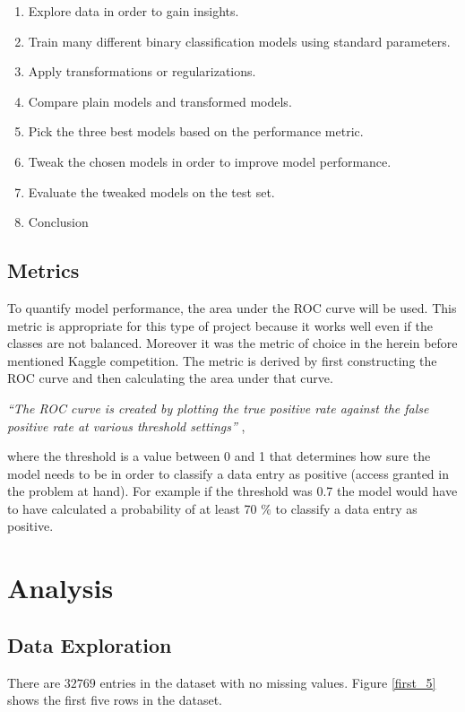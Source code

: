 \documentclass[11pt]{article}
\begin{document}
\begin{enumerate}
    \item Explore data in order to gain insights.
    \item Train many different binary classification models using standard parameters.
    \item Apply transformations or regularizations.
    \item Compare plain models and transformed models.
    \item Pick the three best models based on the performance metric.
    \item Tweak the chosen models in order to improve model performance.
    \item Evaluate the tweaked models on the test set.
    \item Conclusion
\end{enumerate}

\subsection{Metrics}

To quantify model performance, the area under the ROC curve will be used.
This metric is appropriate for this type of project because it works well
even if the classes are not balanced. Moreover it was the metric of choice
in the herein before mentioned Kaggle competition.
The metric is derived by first constructing the ROC curve and then 
calculating the area under that curve. 

{\it``The ROC curve is created by plotting the true positive rate against the false 
positive rate at various threshold settings''} \cite{rocCurve},
 
where the threshold is a value between 0 and 1 that determines how sure the model needs 
to be in order to classify a data entry as positive (access granted in the problem at hand). 
For example if the threshold was 0.7 the model would have to have calculated a probability 
of at least 70 $\%$ to classify a data entry as positive.

\section{Analysis}

\subsection{Data Exploration}

There are $32769$ entries in the dataset with no missing values. 
Figure \ref{first_5} shows the first five rows in the dataset.
\end{document}
